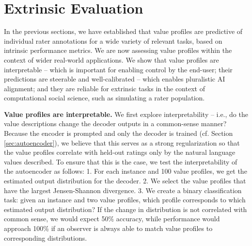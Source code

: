 \documentclass[11pt]{article}
\begin{document}
\section{Extrinsic Evaluation}
\label{sec:extrinsicevaluation}

In the previous sections, we have established that value profiles are predictive of individual rater annotations for a wide variety of relevant tasks, based on intrinsic performance metrics. 
We are now assessing value profiles within the context of wider real-world applications. We show that value profiles are interpretable -- which is important for enabling control by the end-user; their predictions are steerable and well-calibrated -- which enables pluralistic AI alignment; and they are reliable for extrinsic tasks in the context of computational social science, such as simulating a rater population.

\textbf{Value profiles are interpretable.}\label{sec:interpretability}
We first explore interpretability --
i.e.,
do the value descriptions change the decoder outputs in a common-sense manner? Because the encoder is prompted and only the decoder is trained (cf. Section \ref{sec:autoencoder}), we believe that this serves as a strong regularization so that the value profiles correlate with held-out ratings only by the natural language
values described. To ensure that this is the case, we test the interpretability of the autoencoder as follows:
1. For each instance and 100 value profiles, we get the estimated output distribution for the decoder.
2. We select the value profiles that have the largest Jensen-Shannon divergence.
3. We create
a
binary classification task: given an instance and two value profiles, which profile corresponds to which estimated output distribution?
If the change in distribution is not correlated with common sense, we would expect 50\% accuracy, while performance would approach 100\% if an observer is always able to
match value profiles to corresponding distributions.
\end{document}
